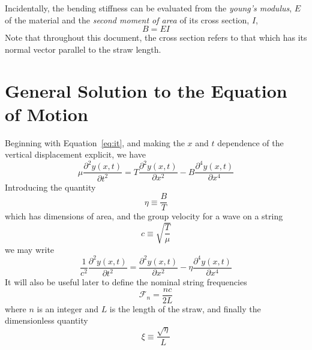 \documentclass[twoside]{article}
\begin{document}
\begin{multicols}{2}
Incidentally, the bending stiffness can be evaluated from the \emph{young's modulus}, $E$ of the material and the \emph{second moment of area} of its cross section, $I$,
\begin{equation}
B = E I
\end{equation}
Note that throughout this document, the cross section refers to that which has its normal vector parallel to the straw length.





\section{General Solution to the Equation of Motion}
Beginning with Equation~\ref{eq:it}, and making the $x$ and $t$ dependence of the vertical displacement explicit, we have 
\begin{equation}
\mu \frac{\partial^2y(x,t)}{\partial t^2} = T \frac{\partial^2y(x,t)}{\partial x^2} - B \frac{\partial^4y(x,t)}{\partial x^4}
\end{equation}
Introducing the quantity
\begin{equation}
\eta  \equiv \frac{B}{T}
\end{equation}
which has dimensions of area, and the group velocity for a wave on a string
\begin{equation}
c  \equiv \sqrt{\frac{T}{\mu}}
\end{equation}
we may write
\begin{equation}
\frac{1}{c^2} \frac{\partial^2y(x,t)}{\partial t^2} = \frac{\partial^2y(x,t)}{\partial x^2} - \eta \frac{\partial^4y(x,t)}{\partial x^4}
\label{eq:mot}
\end{equation}
It will also be useful later to define the nominal string frequencies
\begin{equation}
	\mathcal{F}_n = \frac{nc}{2L}
\end{equation}
where $n$ is an integer and $L$ is the length of the straw, and finally the dimensionless quantity
\begin{equation}
\xi  \equiv \frac{\sqrt{\eta}}{L}
\label{eq:xi}
\end{equation}


\end{multicols}
\end{document}
